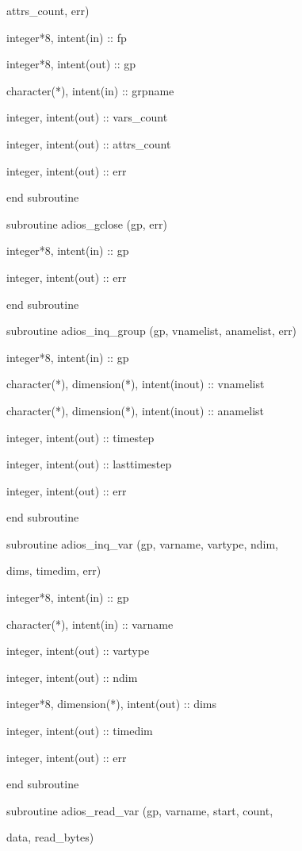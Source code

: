 \parindent=86pt
attrs\_count, err)

\parindent=36pt
integer*8,      intent(in)  :: fp

integer*8,      intent(out) :: gp

character(*),   intent(in)  :: grpname

integer,        intent(out) :: vars\_count

integer,        intent(out) :: attrs\_count

integer,        intent(out) :: err

\parindent=0pt
end subroutine

subroutine adios\_gclose (gp, err)

\parindent=36pt
integer*8,      intent(in)  :: gp

integer,        intent(out) :: err

\parindent=0pt
end subroutine

subroutine adios\_inq\_group (gp, vnamelist, anamelist, err)

\parindent=36pt
integer*8,      intent(in)  :: gp

character(*), dimension(*), intent(inout) :: vnamelist

character(*), dimension(*), intent(inout) :: anamelist

integer,        intent(out) :: timestep

integer,        intent(out) :: lasttimestep

integer,        intent(out) :: err

\parindent=0pt
end subroutine

subroutine adios\_inq\_var (gp, varname, vartype, ndim, 

\parindent=93pt
dims, timedim, err)

\parindent=36pt
integer*8,      intent(in)  :: gp

character(*),   intent(in)  :: varname

integer,        intent(out) :: vartype

integer,        intent(out) :: ndim

integer*8, dimension(*), intent(out) :: dims

integer,        intent(out) :: timedim

integer,        intent(out) :: err

\parindent=0pt
end subroutine

subroutine adios\_read\_var (gp, varname, start, count,

\parindent=97pt
data, read\_bytes)

